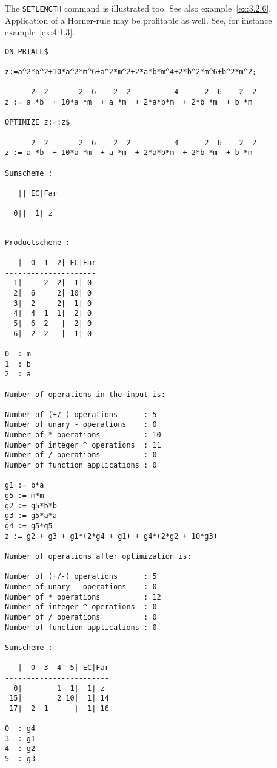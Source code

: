 The {\tt SETLENGTH} command is illustrated too. See also example~\ref{ex:3.2.6}.
Application of a Horner-rule may be profitable as well. See, for instance
example~\ref{ex:4.1.3}.
{\small
\begin{verbatim}
ON PRIALL$

z:=a^2*b^2+10*a^2*m^6+a^2*m^2+2*a*b*m^4+2*b^2*m^6+b^2*m^2;

      2  2       2  6    2  2          4      2  6    2  2
z := a *b  + 10*a *m  + a *m  + 2*a*b*m  + 2*b *m  + b *m

OPTIMIZE z:=:z$

      2  2       2  6    2  2          4      2  6    2  2
z := a *b  + 10*a *m  + a *m  + 2*a*b*m  + 2*b *m  + b *m

Sumscheme :

   || EC|Far
------------
  0||  1| z
------------
\end{verbatim}}
\newpage
{\small
\begin{verbatim}
Productscheme :

   |  0  1  2| EC|Far
---------------------
  1|     2  2|  1| 0
  2|  6     2| 10| 0
  3|  2     2|  1| 0
  4|  4  1  1|  2| 0
  5|  6  2   |  2| 0
  6|  2  2   |  1| 0
---------------------
0  : m
1  : b
2  : a

Number of operations in the input is: 

Number of (+/-) operations      : 5
Number of unary - operations    : 0
Number of * operations          : 10
Number of integer ^ operations  : 11
Number of / operations          : 0
Number of function applications : 0

g1 := b*a
g5 := m*m
g2 := g5*b*b
g3 := g5*a*a
g4 := g5*g5
z := g2 + g3 + g1*(2*g4 + g1) + g4*(2*g2 + 10*g3)

Number of operations after optimization is:

Number of (+/-) operations      : 5
Number of unary - operations    : 0
Number of * operations          : 12
Number of integer ^ operations  : 0
Number of / operations          : 0
Number of function applications : 0

Sumscheme :

   |  0  3  4  5| EC|Far
------------------------
  0|        1  1|  1| z
 15|        2 10|  1| 14
 17|  2  1      |  1| 16
------------------------
0  : g4
3  : g1
4  : g2
5  : g3
\end{verbatim}}
\newpage
